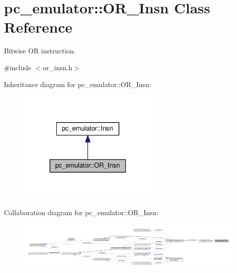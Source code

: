 \hypertarget{classpc__emulator_1_1OR__Insn}{}\section{pc\+\_\+emulator\+:\+:O\+R\+\_\+\+Insn Class Reference}
\label{classpc__emulator_1_1OR__Insn}


Bitwise OR instruction.  




{\ttfamily \#include $<$or\+\_\+insn.\+h$>$}



Inheritance diagram for pc\+\_\+emulator\+:\+:O\+R\+\_\+\+Insn\+:
\nopagebreak
\begin{figure}[H]
\begin{center}
\leavevmode
\includegraphics[width=195pt]{classpc__emulator_1_1OR__Insn__inherit__graph}
\end{center}
\end{figure}


Collaboration diagram for pc\+\_\+emulator\+:\+:O\+R\+\_\+\+Insn\+:
\nopagebreak
\begin{figure}[H]
\begin{center}
\leavevmode
\includegraphics[width=350pt]{classpc__emulator_1_1OR__Insn__coll__graph}
\end{center}
\end{figure}
